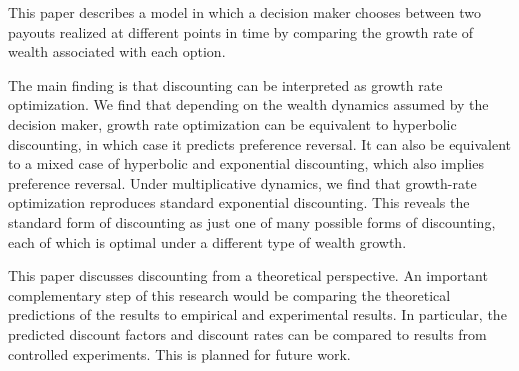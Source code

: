 \documentclass[11pt]{article}
\numberwithin{equation}{section}
\begin{document}
This paper describes a model in which a decision maker chooses between two payouts realized at different points in time by comparing the growth rate of wealth associated with each option.

The main finding is that discounting can be interpreted as growth rate optimization. We find that depending on the wealth dynamics assumed by the decision maker, growth rate optimization can be equivalent to hyperbolic discounting, in which case it predicts preference reversal. It can also be equivalent to a mixed case of hyperbolic and exponential discounting, which also implies preference reversal. Under multiplicative dynamics, we find that growth-rate optimization reproduces standard exponential discounting. This reveals the standard form of discounting as just one of many possible forms of discounting, each of which is optimal under a different type of wealth growth.



This paper discusses discounting from a theoretical perspective. An important complementary step of this research would be comparing the theoretical predictions of the results to empirical and experimental results. In particular, the predicted discount factors and discount rates can be compared to results from controlled experiments. This is planned for future work.

\end{document}

